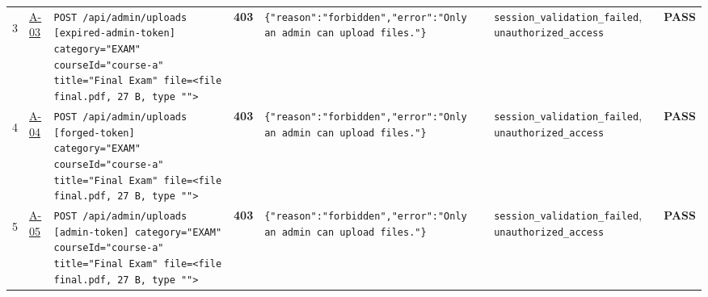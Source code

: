 \documentclass[10pt,a4paper]{article}
\begin{document}
\begin{landscape}
\begin{longtable}{@{}P{0.6cm}P{0.9cm}P{8.5cm}P{1.0cm}P{6.2cm}P{4.2cm}P{1.1cm}@{}}
\hypertarget{call3}{3} & \hyperlink{test-A-03}{A-03} & \texttt{POST /\allowbreak{}api/\allowbreak{}admin/\allowbreak{}uploads [expired-\allowbreak{}admin-\allowbreak{}token] category=\allowbreak{}"\allowbreak{}EXAM"\allowbreak{} courseId=\allowbreak{}"\allowbreak{}course-\allowbreak{}a"\allowbreak{} title=\allowbreak{}"\allowbreak{}Final Exam"\allowbreak{} file=\allowbreak{}<file final.\allowbreak{}pdf,\allowbreak{} 27 B,\allowbreak{} type "\allowbreak{}"\allowbreak{}>} & \textcolor{warnamber}{\textbf{403}} & \texttt{\{"\allowbreak{}reason"\allowbreak{}:\allowbreak{}"\allowbreak{}forbidden"\allowbreak{},\allowbreak{}"\allowbreak{}error"\allowbreak{}:\allowbreak{}"\allowbreak{}Only an admin can upload files.\allowbreak{}"\allowbreak{}\}} & \texttt{session\_\allowbreak{}validation\_\allowbreak{}failed}, \texttt{unauthorized\_\allowbreak{}access} & \textcolor{passgreen}{\textbf{PASS}} \\
\hypertarget{call4}{4} & \hyperlink{test-A-04}{A-04} & \texttt{POST /\allowbreak{}api/\allowbreak{}admin/\allowbreak{}uploads [forged-\allowbreak{}token] category=\allowbreak{}"\allowbreak{}EXAM"\allowbreak{} courseId=\allowbreak{}"\allowbreak{}course-\allowbreak{}a"\allowbreak{} title=\allowbreak{}"\allowbreak{}Final Exam"\allowbreak{} file=\allowbreak{}<file final.\allowbreak{}pdf,\allowbreak{} 27 B,\allowbreak{} type "\allowbreak{}"\allowbreak{}>} & \textcolor{warnamber}{\textbf{403}} & \texttt{\{"\allowbreak{}reason"\allowbreak{}:\allowbreak{}"\allowbreak{}forbidden"\allowbreak{},\allowbreak{}"\allowbreak{}error"\allowbreak{}:\allowbreak{}"\allowbreak{}Only an admin can upload files.\allowbreak{}"\allowbreak{}\}} & \texttt{session\_\allowbreak{}validation\_\allowbreak{}failed}, \texttt{unauthorized\_\allowbreak{}access} & \textcolor{passgreen}{\textbf{PASS}} \\
\hypertarget{call5}{5} & \hyperlink{test-A-05}{A-05} & \texttt{POST /\allowbreak{}api/\allowbreak{}admin/\allowbreak{}uploads [admin-\allowbreak{}token] category=\allowbreak{}"\allowbreak{}EXAM"\allowbreak{} courseId=\allowbreak{}"\allowbreak{}course-\allowbreak{}a"\allowbreak{} title=\allowbreak{}"\allowbreak{}Final Exam"\allowbreak{} file=\allowbreak{}<file final.\allowbreak{}pdf,\allowbreak{} 27 B,\allowbreak{} type "\allowbreak{}"\allowbreak{}>} & \textcolor{warnamber}{\textbf{403}} & \texttt{\{"\allowbreak{}reason"\allowbreak{}:\allowbreak{}"\allowbreak{}forbidden"\allowbreak{},\allowbreak{}"\allowbreak{}error"\allowbreak{}:\allowbreak{}"\allowbreak{}Only an admin can upload files.\allowbreak{}"\allowbreak{}\}} & \texttt{session\_\allowbreak{}validation\_\allowbreak{}failed}, \texttt{unauthorized\_\allowbreak{}access} & \textcolor{passgreen}{\textbf{PASS}} \\

\end{longtable}
\end{landscape}
\end{document}
